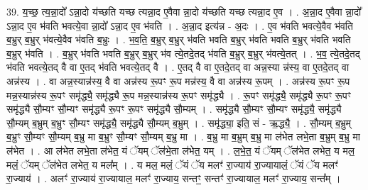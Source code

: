 \documentclass[17pt]{extarticle}
\begin{document}
39. य॒च्छ॒ त्य॒न्ना॒दो᳚ ऽन्ना॒दो य॑च्छति यच्छ त्यन्ना॒द ए॒वैवा न्ना॒दो य॑च्छति यच्छ त्यन्ना॒द ए॒व । . अ॒न्ना॒द ए॒वैवा न्ना॒दो᳚ ऽन्ना॒द ए॒व भ॑वति भवत्ये॒वा न्ना॒दो᳚ ऽन्ना॒द ए॒व भ॑वति । . अ॒न्ना॒द इत्य॑न्न - अ॒दः । . ए॒व भ॑वति भवत्ये॒वैव भ॑वति ब॒भ्रुर् ब॒भ्रुर् भ॑वत्ये॒वैव भ॑वति ब॒भ्रुः । . भ॒व॒ति॒ ब॒भ्रुर् ब॒भ्रुर् भ॑वति भवति ब॒भ्रुर् भ॑वति भवति ब॒भ्रुर् भ॑वति भवति ब॒भ्रुर् भ॑वति । . ब॒भ्रुर् भ॑वति भवति ब॒भ्रुर् ब॒भ्रुर् भ॑व त्ये॒तदे॒तद् भ॑वति ब॒भ्रुर् ब॒भ्रुर् भ॑वत्ये॒तत् । . भ॒व॒ त्ये॒तदे॒तद् भ॑वति भवत्ये॒तद् वै वा ए॒तद् भ॑वति भवत्ये॒तद् वै । . ए॒तद् वै वा ए॒तदे॒तद् वा अन्न॒स्या न्न॑स्य॒ वा ए॒तदे॒तद् वा अन्न॑स्य । . वा अन्न॒स्यान्न॑स्य॒ वै वा अन्न॑स्य रू॒पꣳ रू॒प मन्न॑स्य॒ वै वा अन्न॑स्य रू॒पम् । . अन्न॑स्य रू॒पꣳ रू॒प मन्न॒स्यान्न॑स्य रू॒पꣳ समृ॑द्ध्यै॒ समृ॑द्ध्यै रू॒प मन्न॒स्यान्न॑स्य रू॒पꣳ समृ॑द्ध्यै । . रू॒पꣳ समृ॑द्ध्यै॒ समृ॑द्ध्यै रू॒पꣳ रू॒पꣳ समृ॑द्ध्यै सौ॒म्यꣳ सौ॒म्यꣳ समृ॑द्ध्यै रू॒पꣳ रू॒पꣳ समृ॑द्ध्यै सौ॒म्यम् । . समृ॑द्ध्यै सौ॒म्यꣳ सौ॒म्यꣳ समृ॑द्ध्यै॒ समृ॑द्ध्यै सौ॒म्यम् ब॒भ्रुम् ब॒भ्रुꣳ सौ॒म्यꣳ समृ॑द्ध्यै॒ समृ॑द्ध्यै सौ॒म्यम् ब॒भ्रुम् । . समृ॑द्ध्या॒ इति॒ सं - ऋ॒द्ध्यै॒ । . सौ॒म्यम् ब॒भ्रुम् ब॒भ्रुꣳ सौ॒म्यꣳ सौ॒म्यम् ब॒भ्रु मा ब॒भ्रुꣳ सौ॒म्यꣳ सौ॒म्यम् ब॒भ्रु मा । . ब॒भ्रु मा ब॒भ्रुम् ब॒भ्रु मा ल॑भेत लभे॒ता ब॒भ्रुम् ब॒भ्रु मा ल॑भेत । . आ ल॑भेत लभे॒ता ल॑भेत॒ यं ॅयम् ॅल॑भे॒ता ल॑भेत॒ यम् । . ल॒भे॒त॒ यं ॅयम् ॅल॑भेत लभेत॒ य मल॒ मलं॒ ॅयम् ॅल॑भेत लभेत॒ य मल᳚म् । . य मल॒ मलं॒ ॅयं ॅय मलꣳ॑ रा॒ज्याय॑ रा॒ज्यायालं॒ ॅयं ॅय मलꣳ॑ रा॒ज्याय॑ । . अलꣳ॑ रा॒ज्याय॑ रा॒ज्यायाल॒ मलꣳ॑ रा॒ज्याय॒ सन्तꣳ॒॒ सन्तꣳ॑ रा॒ज्यायाल॒ मलꣳ॑ रा॒ज्याय॒ सन्त᳚म् । \newline
\pagebreak
{}
\end{document}
